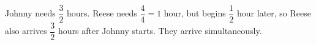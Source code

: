Johnny needs $\dfrac{3}{2}$ hours. Reese needs $\dfrac{4}{4}=1$ hour, but begins $\dfrac{1}{2}$ hour later, so Reese also arrives $\dfrac{3}{2}$ hours after Johnny starts. They arrive simultaneously.
